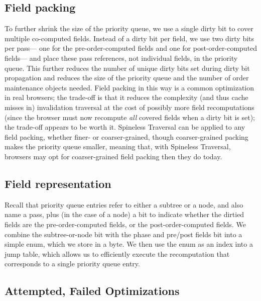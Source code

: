 \subsection{Field packing}

To further shrink the size of the priority queue,
  we use a single dirty bit to cover multiple co-computed fields.
Instead of a dirty bit per field,
  we use two dirty bits per pass---%
  one for the pre-order-computed fields
  and one for post-order-computed fields---%
  and place these pass references,
  not individual fields, in the priority queue.
This further reduces the number of unique dirty bits
  set during dirty bit propagation
  and reduces the size of the priority queue
  and the number of order maintenance objects needed.
Field packing in this way is a common optimization in real browsers;
  the trade-off is that it reduces the complexity
  (and thus cache misses in) invalidation traversal
  at the cost of possibly more field recomputations
  (since the browser must now recompute \emph{all} covered fields
  when a dirty bit is set);
  the trade-off appears to be worth it.
Spineless Traversal can be applied to any field packing,
  whether finer- or coarser-grained,
  though coarser-grained packing makes
  the priority queue smaller,
  meaning that, with Spineless Traversal,
  browsers may opt for coarser-grained field packing
  then they do today.

\subsection{Field representation}

Recall that priority queue entries
  refer to either a subtree or a node,
  and also name a pass, plus (in the case of a node) a bit to indicate whether 
  the dirtied fields are the pre-order-computed fields,
  or the post-order-computed fields.
We combine the subtree-or-node bit with the phase and pre/post fields bit
  into a simple enum, which we store in a byte.
We then use the enum as an index into a jump table,
  which allows us to efficiently execute the recomputation
  that corresponds to a single priority queue entry.

\subsection{Attempted, Failed Optimizations}

